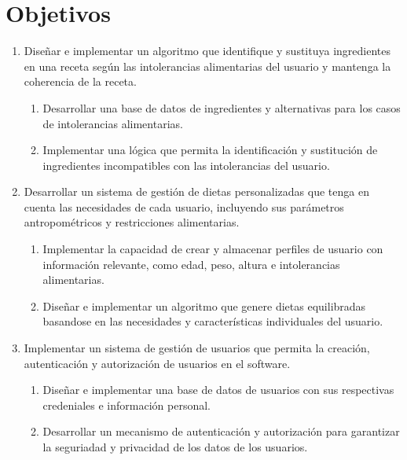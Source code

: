 \section{Objetivos}
\begin{enumerate}
    \item Diseñar e implementar un algoritmo que identifique y sustituya ingredientes en una receta según las intolerancias alimentarias del usuario y mantenga la coherencia de la receta.
    \begin{enumerate}
        \item Desarrollar una base de datos de ingredientes y alternativas para los casos de intolerancias alimentarias.
        \item Implementar una lógica que permita la identificación y sustitución de ingredientes incompatibles con las intolerancias del usuario.
    \end{enumerate}
    \item Desarrollar un sistema de gestión de dietas personalizadas que tenga en cuenta las necesidades de cada usuario, incluyendo sus parámetros antropométricos y restricciones alimentarias.
    \begin{enumerate}
        \item Implementar la capacidad de crear y almacenar perfiles de usuario con información relevante, como edad, peso, altura e intolerancias alimentarias.
        \item Diseñar e implementar un algoritmo que genere dietas equilibradas basandose en las necesidades y características individuales del usuario.
    \end{enumerate}
    \item Implementar un sistema de gestión de usuarios que permita la creación, autenticación y autorización de usuarios en el software. 
    \begin{enumerate}
        \item Diseñar e implementar una base de datos de usuarios con sus respectivas credeniales e información personal. 
        \item Desarrollar un mecanismo de autenticación y autorización para garantizar la seguriadad y privacidad de los datos de los usuarios.
    \end{enumerate}
\end{enumerate}